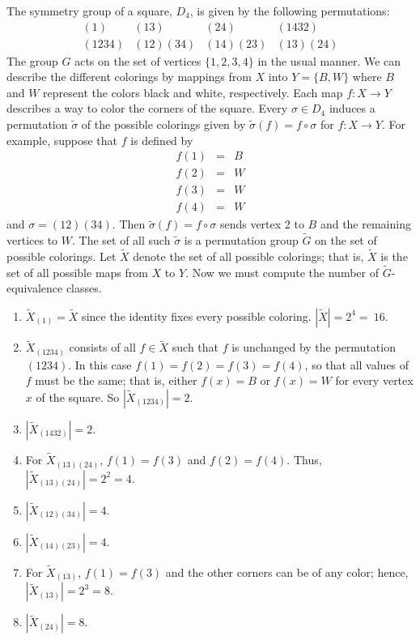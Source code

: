  
The  symmetry group of a square, $D_4$, is given by the following
permutations: 
\[
\begin{array}{cccc}
(1)    & (13)     & (24)     & (1432) \\
(1234) & (12)(34) & (14)(23) & (13)(24)
\end{array}
\]
The group $G$ acts on the set of vertices $\{ 1, 2, 3, 4\}$ in the
usual manner. We can describe the different colorings by mappings from
$X$ into $Y = \{ B, W \}$ where $B$ and $W$ represent the colors black
and white, respectively. Each map $f : X \rightarrow Y$ describes a
way to color the corners of the square. Every $\sigma \in D_4$ induces
a permutation $\widetilde{ \sigma }$ of the possible colorings given
by $\widetilde{\sigma}(f) = f \circ \sigma$ for $f : X \rightarrow Y$.
For example, suppose that $f$ is defined by 
\begin{eqnarray*}
f(1) & = & B \\
f(2) & = & W \\
f(3) & = & W \\
f(4) & = & W
\end{eqnarray*}
and $\sigma = (1 2)(3 4)$. Then $\widetilde{\sigma}(f) = f \circ
\sigma$ sends vertex 2 to $B$ and the remaining vertices to $W$. The
set of all such $\widetilde{\sigma}$ is a permutation group
$\widetilde{G}$ on the set of possible colorings. Let $\widetilde{X}$
denote the set of all possible colorings; that is, $\widetilde{X}$ is
the set of all possible maps from $X$ to $Y$.  Now we must compute the
number of $\widetilde{G}$-equivalence classes. 
\begin{enumerate}
 
\item
$\widetilde{X}_{(1)} = \widetilde{X}$ since the identity fixes every
possible coloring. $|\widetilde{X}| = 2^4 =~16$.
 
\item
$\widetilde{X}_{(1 2 3 4)}$ consists of all $f \in \widetilde{X}$ such
that $f$ is unchanged by the permutation $(1 23 4)$. In this case
$f(1) = f(2) = f(3) = f(4)$, so that all values of $f$ must be the 
same; that is, either $f(x)= B$ or $f(x)= W$ for every vertex $x$ of 
the square. So $|\widetilde{X}_{(1 2 3 4)}| = 2$.
 
\item 
$|\widetilde{X}_{(1 4 3 2)}| = 2$.
 
\item 
For $\widetilde{X}_{(1 3)(2 4)}$, $f(1) = f(3)$ and $f(2) =
f(4)$. Thus, $|\widetilde{X}_{(13)(24)}| = 2^2 = 4$.
 
\item 
$|\widetilde{X}_{(1 2)(3 4)}| = 4$.
 
\item 
$|\widetilde{X}_{(1 4)(2 3)}| = 4$.
 
\item 
For $\widetilde{X}_{(1  3 )}$, $f(1) = f(3)$ and the other corners can
be of any color; hence, $|\widetilde{X}_{(1 3)}| = 2^3 = 8$.
 
\item 
$|\widetilde{X}_{(2 4)}| = 8$.
 
\end{enumerate}
